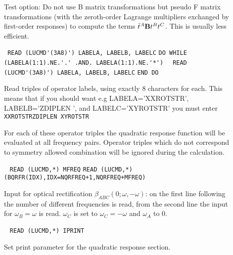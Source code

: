 \begin{description}
\item[] 
Test option:
Do not use B matrix transformations but pseudo F matrix 
transformations (with the zeroth-order Lagrange multipliers 
exchanged by first-order responses) to compute the terms
$\bar{t}^A {\bf B} t^{B} t^{C}$. This is usually less
efficient.

\item[] \verb| |\newline
\verb|READ (LUCMD'(3A8)') LABELA, LABELB, LABELC|\newline
\verb|DO WHILE (LABELA(1:1).NE.'.' .AND. LABELA(1:1).NE.'*')|\newline
\verb|  READ (LUCMD'(3A8)') LABELA, LABELB, LABELC|\newline
\verb|END DO|

Read triples of operator labels, using exactly 8 characters for each. 
This means that if you should want e.g LABELA='XXROTSTR', LABELB='ZDIPLEN ', and LABELC='XYROTSTR'
you must enter\newline
\verb|XXROTSTRZDIPLEN XYROTSTR|

For each of these operator triples the quadratic response
function will be evaluated at all frequency pairs.
Operator triples which do not correspond to symmetry allowed
combination will be ignored during the calculation.
 
\item[]  \verb| |\newline
   \verb|READ (LUCMD,*) MFREQ|\newline
   \verb|READ (LUCMD,*) (BQRFR(IDX),IDX=NQRFREQ+1,NQRFREQ+MFREQ)|

   Input for optical rectification $\beta_{ABC}(0;\omega,-\omega)$:
   on the first line following  the number of different
   frequencies is read, from the second line the input for 
   $\omega_B = \omega$ is read. $\omega_C$ is set to $\omega_C = -\omega$ and
   $\omega_A$ to $0$.

\item[] \verb| |\newline
     \verb|READ (LUCMD,*) IPRINT|

     Set print parameter for the quadratic response section.
 

\end{description}
